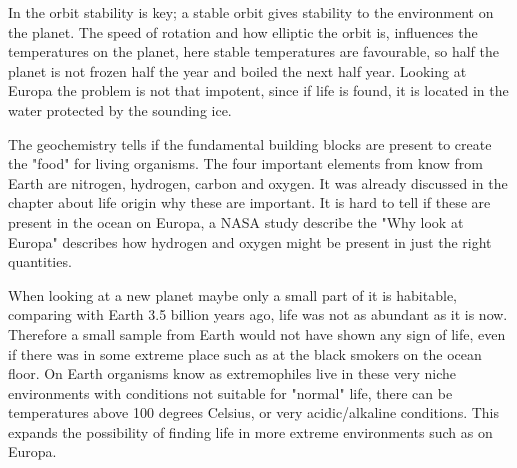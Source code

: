 In the orbit stability is key; a stable orbit gives stability to the environment on the planet. The speed of rotation and how elliptic the orbit is, influences the temperatures on the planet, here stable temperatures are favourable, so half the planet is not frozen half the year and boiled the next half year. Looking at Europa the problem is not that impotent, since if life is found, it is located in the water protected by the sounding ice.

The geochemistry tells if the fundamental building blocks are present to create the "food" for living organisms. The four important elements from know from Earth are nitrogen, hydrogen, carbon and oxygen. It was already discussed in the chapter about life origin why these are important.  It is hard to tell if these are present in the ocean on Europa, a NASA study describe the "Why look at Europa" describes how hydrogen and oxygen might be present in just the right quantities.

When looking at a new planet maybe only a small part of it is habitable, comparing with Earth 3.5 billion years ago, life was not as abundant as it is now. Therefore a small sample from Earth would not have shown any sign of life, even if there was in some extreme place such as at the black smokers on the ocean floor. On Earth organisms know as extremophiles live in these very niche environments with conditions not suitable for "normal" life, there can be temperatures above 100 degrees Celsius, or very acidic/alkaline conditions. This expands the possibility of finding life in more extreme environments such as on Europa.

